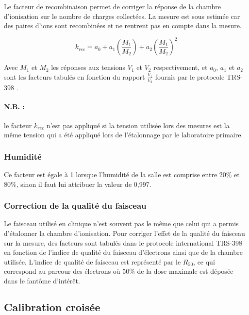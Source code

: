 \documentclass{article}
\begin{document}
Le facteur de recombinaison permet de corriger la réponse de la chambre d'ionisation sur le nombre de charges collectées. La mesure est sous estimée car des paires d'ions sont recombinées et ne rentrent pas en compte dans la mesure.

\begin{equation}
  k_{rec} = a_0 + a_1 \left(\dfrac{M_1}{M_2}\right) + a_2 \left(\dfrac{M_1}{M_2}\right) ^2
  \label{eq_rec}
\end{equation}

Avec $M_1$ et $M_2$ les réponses aux tensions $V_1$ et $V_2$ respectivement, et $a_0$, $a_1$ et $a_2$ sont les facteurs tabulés en fonction du rapport $\frac{V_1}{V_2}$ fournis par le protocole TRS-398 \cite{international2001iaea}.

\paragraph*{N.B. :} le facteur $k_{rec}$ n'est pas appliqué si la tension utilisée lors des mesures est la même tension qui a été appliqué lors de l'étalonnage par le laboratoire primaire.

\subsubsection{Humidité}

Ce facteur est égale à 1 lorsque l'humidité de la salle est comprise entre 20\% et 80\%, sinon il faut lui attribuer la valeur de 0,997.

\subsubsection{Correction de la qualité du faisceau}

Le faisceau utilisé en clinique n'est souvent pas le même que celui qui a permis d'étalonner la chambre d'ionisation. Pour corriger l'effet de la qualité du faisceau sur la mesure, des facteurs sont tabulés dans le protocole international TRS-398 en fonction de l'indice de qualité du faisceau d'électrons ainsi que de la chambre utilisée. L'indice de qualité de faisceau est représenté par le $R_{50}$, ce qui correspond au parcour des électrons où 50\% de la dose maximale est déposée dans le fantôme d'intérêt.

\subsection{Calibration croisée}
\end{document}
